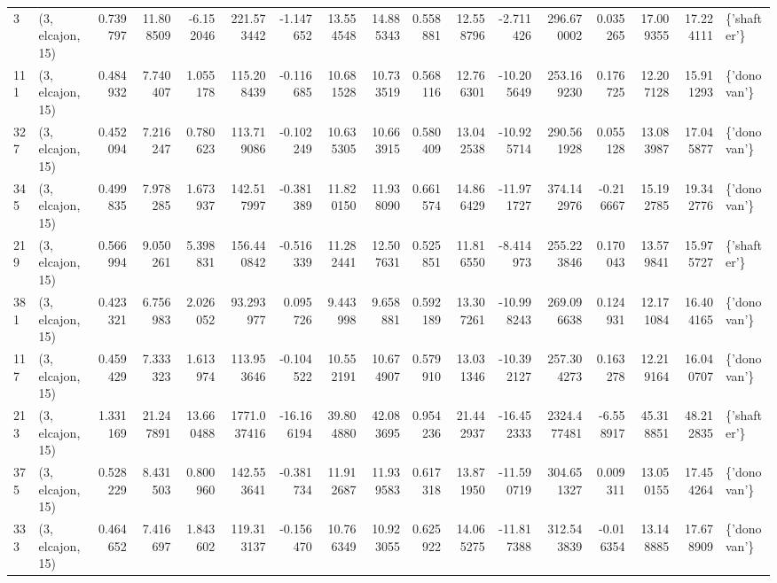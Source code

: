 \begin{tabular}{llrrrrrrrrrrrrrrl}
3   &  (3, elcajon, 15) &   0.739797 &  11.808509 &  -6.152046 &   221.573442 &  -1.147652 &  13.554548 &  14.885343 &  0.558881 &  12.558796 &  -2.711426 &   296.670002 &   0.035265 &  17.009355 &  17.224111 &  \{'shafter'\} \\
111 &  (3, elcajon, 15) &   0.484932 &   7.740407 &   1.055178 &   115.208439 &  -0.116685 &  10.681528 &  10.733519 &  0.568116 &  12.766301 & -10.205649 &   253.169230 &   0.176725 &  12.207128 &  15.911293 &  \{'donovan'\} \\
327 &  (3, elcajon, 15) &   0.452094 &   7.216247 &   0.780623 &   113.719086 &  -0.102249 &  10.635305 &  10.663915 &  0.580409 &  13.042538 & -10.925714 &   290.561928 &   0.055128 &  13.083987 &  17.045877 &  \{'donovan'\} \\
345 &  (3, elcajon, 15) &   0.499835 &   7.978285 &   1.673937 &   142.517997 &  -0.381389 &  11.820150 &  11.938090 &  0.661574 &  14.866429 & -11.971727 &   374.142976 &  -0.216667 &  15.192785 &  19.342776 &  \{'donovan'\} \\
219 &  (3, elcajon, 15) &   0.566994 &   9.050261 &   5.398831 &   156.440842 &  -0.516339 &  11.282441 &  12.507631 &  0.525851 &  11.816550 &  -8.414973 &   255.223846 &   0.170043 &  13.579841 &  15.975727 &  \{'shafter'\} \\
381 &  (3, elcajon, 15) &   0.423321 &   6.756983 &   2.026052 &    93.293977 &   0.095726 &   9.443998 &   9.658881 &  0.592189 &  13.307261 & -10.998243 &   269.096638 &   0.124931 &  12.171084 &  16.404165 &  \{'donovan'\} \\
117 &  (3, elcajon, 15) &   0.459429 &   7.333323 &   1.613974 &   113.953646 &  -0.104522 &  10.552191 &  10.674907 &  0.579910 &  13.031346 & -10.392127 &   257.304273 &   0.163278 &  12.219164 &  16.040707 &  \{'donovan'\} \\
213 &  (3, elcajon, 15) &   1.331169 &  21.247891 &  13.660488 &  1771.037416 & -16.166194 &  39.804880 &  42.083695 &  0.954236 &  21.442937 & -16.452333 &  2324.477481 &  -6.558917 &  45.318851 &  48.212835 &  \{'shafter'\} \\
375 &  (3, elcajon, 15) &   0.528229 &   8.431503 &   0.800960 &   142.553641 &  -0.381734 &  11.912687 &  11.939583 &  0.617318 &  13.871950 & -11.590719 &   304.651327 &   0.009311 &  13.050155 &  17.454264 &  \{'donovan'\} \\
333 &  (3, elcajon, 15) &   0.464652 &   7.416697 &   1.843602 &   119.313137 &  -0.156470 &  10.766349 &  10.923055 &  0.625922 &  14.065275 & -11.817388 &   312.543839 &  -0.016354 &  13.148885 &  17.678909 &  \{'donovan'\} \\

\end{tabular}
